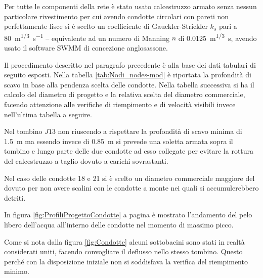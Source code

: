 Per tutte le componenti della rete è stato usato calcestruzzo armato senza nessun particolare rivestimento per cui avendo condotte circolari con pareti non perfettamente lisce si è scelto un coefficiente di Gauckler-Strickler $k_s$ pari a \SI{80}{\metre\tothe{1/3}\per\second} -- equivalente ad un numero di Manning $n$ di \SI{0.0125}{\metre\tothe{1/3}\second}, avendo usato il software SWMM di concezione anglosassone.

Il procedimento descritto nel paragrafo precedente è alla base dei dati tabulari di seguito esposti.  
Nella tabella \ref{tab:Nodi_nodes-mod} è riportata la profondità di scavo in base alla pendenza scelta delle condotte. 
Nella tabella successiva si ha il calcolo del diametro di progetto e la relativa scelta del diametro commerciale, facendo attenzione alle verifiche di riempimento e di velocità visibili invece nell'ultima tabella a seguire.

Nel tombino $J13$ non riuscendo a rispettare la profondità di scavo minima di \SI{1.5}{\metre} ma essendo invece di \SI{0.85}{\metre} si prevede una soletta armata sopra il tombino e lungo parte delle due condotte ad esso collegate per evitare la rottura del calcestruzzo a taglio dovuto a carichi sovrastanti. 

Nel caso delle condotte 18 e 21 si è scelto un diametro commerciale maggiore del dovuto per non avere scalini con le condotte a monte nei quali si accumulerebbero detriti. 

In figura \ref{fig:ProfiliProgettoCondotte} a pagina \pageref{fig:ProfiliProgettoCondotte} è mostrato l'andamento del pelo libero dell'acqua all'interno delle condotte nel momento di massimo picco.

Come si nota dalla figura \ref{fig:Condotte} alcuni sottobacini sono stati in realtà considerati uniti, facendo convogliare il deflusso nello stesso tombino.
Questo perché con la disposizione iniziale non si soddisfava la verifica del riempimento minimo.

